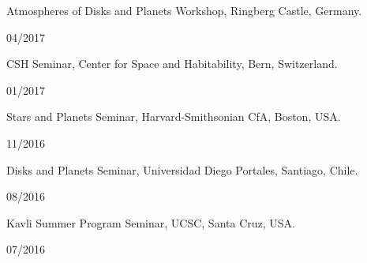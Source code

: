 \documentclass[12pt, a4paper]{article} %
\begin{document}
\begin{minipage}[t]{0.7\textwidth}
\begin{flushleft}%
  \setlength{\leftskip}{0.2cm}%
Atmospheres of Disks and Planets Workshop, Ringberg Castle, Germany.
\end{flushleft}
\end{minipage}
\begin{minipage}[t]{0.3\textwidth}
\hfill 04/2017
\end{minipage}

\begin{minipage}[t]{0.7\textwidth}
\begin{flushleft}%
  \setlength{\leftskip}{0.2cm}%
CSH Seminar, Center for Space and Habitability, Bern, Switzerland.
\end{flushleft}
\end{minipage}
\begin{minipage}[t]{0.3\textwidth}
\hfill 01/2017
\end{minipage}

\begin{minipage}[t]{0.7\textwidth}
\begin{flushleft}%
  \setlength{\leftskip}{0.2cm}%
Stars and Planets Seminar, Harvard-Smithsonian CfA, Boston, USA.
\end{flushleft}
\end{minipage}
\begin{minipage}[t]{0.3\textwidth}
\hfill 11/2016
\end{minipage}


\begin{minipage}[t]{0.7\textwidth}
\begin{flushleft}%
  \setlength{\leftskip}{0.2cm}%
Disks and Planets Seminar, Universidad Diego Portales, Santiago, Chile.
\end{flushleft}
\end{minipage}
\begin{minipage}[t]{0.3\textwidth}
\hfill 08/2016
\end{minipage}

\begin{minipage}[t]{0.7\textwidth}
\begin{flushleft}%
  \setlength{\leftskip}{0.2cm}%
Kavli Summer Program Seminar, UCSC, Santa Cruz, USA.
\end{flushleft}
\end{minipage}
\begin{minipage}[t]{0.3\textwidth}
\hfill 07/2016
\end{minipage}
\end{document}
